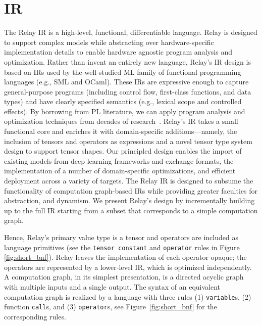 \section{IR}



The Relay IR is a high-level, functional, differentiable language.
Relay is designed to support
  complex models while abstracting over hardware-specific
  implementation details to enable hardware agnostic program
  analysis and optimization.
Rather than invent an entirely new language,
  Relay's IR design is based on IRs used by the well-studied ML family of
  functional programming languages (e.g., SML and OCaml).
These IRs are expressive enough to capture general-purpose programs
  (including control flow, first-class functions, and data types)
  and have clearly specified semantics (e.g., lexical scope and controlled effects).
By borrowing from PL literature,
  we can apply program analysis and optimization techniques from decades of research~\citep{haskell_vector}.
Relay's IR takes a small functional core and enriches it with domain-specific additions---namely,
  the inclusion of tensors and operators as expressions
  and a novel tensor type system design to support tensor shapes.
Our principled design
  enables the import of existing models from deep learning frameworks and exchange formats,
  the implementation of a number of domain-specific optimizations,
  and efficient deployment across a variety of targets.
The Relay IR is designed
  to subsume the functionality of computation graph-based IRs
  while providing greater faculties for abstraction, and dynamism.
We present Relay's design by incrementally building up to the full IR
  starting from a subset that corresponds to a simple computation graph.

Hence, Relay's primary value type is a tensor and operators are included as language primitives
  (see the \verb|tensor constant| and \verb|operator| rules in Figure \ref{fig:short_bnf}).
Relay leaves the implementation of each operator opaque; the operators
  are represented by a lower-level IR, which is optimized independently.
A computation graph, in its simplest presentation, is a directed acyclic
  graph with multiple inputs and a single output.
The syntax of an equivalent computation graph is realized by
  a language with three rules (1) \verb|variable|s, (2) function \verb|call|s,
  and (3) \verb|operator|s, see Figure~\ref{fig:short_bnf} for the corresponding rules.

